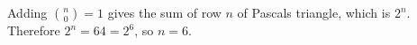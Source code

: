 Adding $\binom n0=1$ gives the sum of row $n$ of Pascal\textquotesingle s triangle, which is $2^n$. Therefore $2^n=64=2^6$, so $\boxed{n=6}$.
